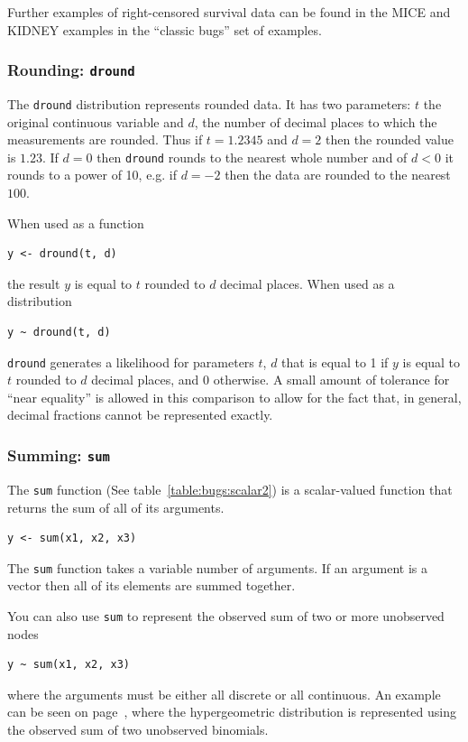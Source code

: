 \documentclass[11pt, a4paper, titlepage]{report}
\begin{document}
{Further examples of right-censored survival data can be found in the
MICE and KIDNEY examples in the ``classic bugs'' set of examples.

\subsubsection{Rounding: \texttt{dround}}

The \texttt{dround} distribution represents rounded data. It has two
parameters: $t$ the original continuous variable and $d$, the number
of decimal places to which the measurements are rounded. Thus if
$t=1.2345$ and $d=2$ then the rounded value is $1.23$. If $d=0$ then
\texttt{dround} rounds to the nearest whole number and of $d < 0$ it
rounds to a power of 10, e.g. if $d=-2$ then the data are rounded to
the nearest $100$.

When used as a function
\begin{verbatim}
y <- dround(t, d)
\end{verbatim}
the result $y$ is equal to $t$ rounded to $d$ decimal places. When
used as a distribution
\begin{verbatim}
y ~ dround(t, d)
\end{verbatim}
\texttt{dround} generates a likelihood for parameters $t$, $d$ that is
equal to 1 if $y$ is equal to $t$ rounded to $d$ decimal places, and 0
otherwise. A small amount of tolerance for ``near equality'' is
allowed in this comparison to allow for the fact that, in general,
decimal fractions cannot be represented exactly.

\subsubsection{Summing: \texttt{sum}}
\label{bugs:sum}

The \texttt{sum} function (See table~\ref{table:bugs:scalar2}) is
a scalar-valued function that returns the sum of all of its arguments.
\begin{verbatim}
y <- sum(x1, x2, x3)
\end{verbatim}
The \texttt{sum} function takes a variable number of arguments. If
an argument is a vector then all of its elements are summed together.

You can also use \texttt{sum} to represent the observed sum of two
or more unobserved nodes
\begin{verbatim}
y ~ sum(x1, x2, x3)
\end{verbatim}
where the arguments must be either all discrete or all continuous.  An
example can be seen on page~\pageref{bugs:dhyper}, where the
hypergeometric distribution is represented using the observed sum of
two unobserved binomials.

}
\end{document}
